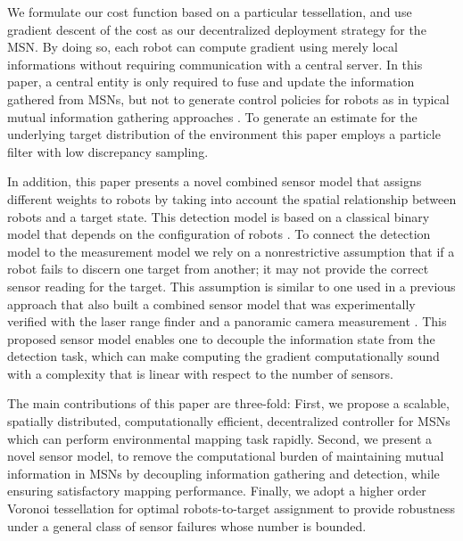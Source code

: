 \documentclass[letterpaper, 10 pt, conference]{ieeeconf}
\begin{document}
We formulate our cost function based on a particular tessellation, and use gradient descent of the cost as our decentralized deployment strategy for the MSN. 
By doing so, each robot can compute gradient using merely local informations without requiring communication with a central server.
In this paper, a central entity is only required to fuse and update the information gathered from MSNs, but not to generate control policies for robots as in typical mutual information gathering approaches \cite{schwager2017multi,julian2012distributed}. 
To generate an estimate for the underlying target distribution of the environment this paper employs a particle filter with low discrepancy sampling. 


In addition, this paper presents a novel combined sensor model that assigns different weights to robots by taking into account the spatial relationship between robots and a target state. 
This detection model is based on a classical binary model that depends on the configuration of robots \cite{viswanathan1997distributed,djuric2008target}. 
To connect the detection model to the measurement model we rely on a nonrestrictive assumption that if a robot fails to discern one target from another; it may not provide the correct sensor reading for the target. 
This assumption is similar to one used in a previous approach that also built a combined sensor model that was experimentally verified with the laser range finder and a panoramic camera measurement \cite{anguelov2004detecting}. 
This proposed sensor model enables one to decouple the information state from the detection task, which can make computing the gradient computationally sound with a complexity that is linear with respect to the number of sensors. 

The main contributions of this paper are three-fold:
First, we propose a scalable, spatially distributed, computationally efficient, decentralized controller for MSNs which can perform environmental mapping task rapidly.
Second, we present a novel sensor model, to remove the computational burden of maintaining mutual information in MSNs by decoupling information gathering and detection, while ensuring satisfactory mapping performance.
Finally, we adopt a higher order Voronoi tessellation for optimal robots-to-target assignment to provide robustness under a general class of sensor failures whose number is bounded.
\end{document}
